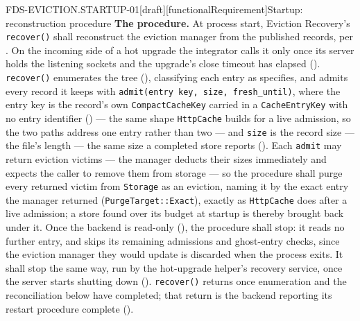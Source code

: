 \begin{requirement}{FDS-EVICTION.STARTUP-01}[draft][functionalRequirement]{Startup: reconstruction procedure}
  \textbf{The procedure.} At process start, Eviction Recovery's
  \texttt{recover()} shall reconstruct the eviction manager from the published
  records, per . On the incoming side of a hot
  upgrade the integrator calls it only once its server holds the listening
  sockets and the upgrade's close timeout has elapsed
  (). \texttt{recover()} enumerates the tree
  (), classifying each entry as
   specifies, and admits every record it keeps
  with \texttt{admit(entry key, size, fresh\_until)}, where the entry key is the
  record's own \texttt{CompactCacheKey} carried in a \texttt{CacheEntryKey} with
  no entry identifier () --- the same shape
  \texttt{HttpCache} builds for a live admission, so the two paths address one
  entry rather than two --- and \texttt{size} is the
  record size --- the file's length --- the same size a completed store
  reports (). Each \texttt{admit} may return
  eviction victims --- the manager deducts their sizes immediately and
  expects the caller to remove them from storage --- so the procedure shall
  purge every returned victim from \texttt{Storage} as an eviction, naming it by
  the exact entry the manager returned (\texttt{PurgeTarget::Exact}), exactly
  as \texttt{HttpCache} does after a live admission; a store found over its
  budget at startup is thereby brought back under it. Once the backend is
  read-only (), the procedure shall stop: it
  reads no further entry, and skips its remaining admissions and ghost-entry
  checks, since the eviction manager they would update is discarded when the
  process exits. It shall stop the same way, run by the hot-upgrade
  helper's recovery service, once the server starts shutting down
  (). \texttt{recover()}
  returns once enumeration and the reconciliation below have completed; that
  return is the backend reporting its restart procedure complete
  ().


\end{requirement}
